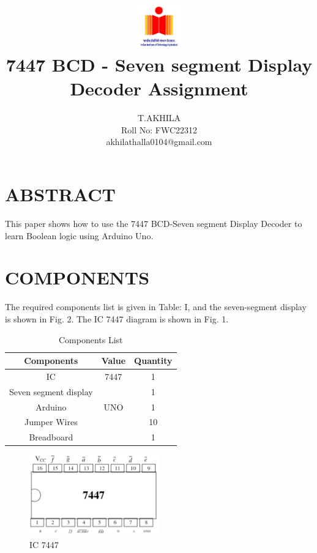 \documentclass[conference]{IEEEtran}
\title{
\vspace{1cm}
{\includegraphics[width=0.15\textwidth]{IMG-20241119-WA0001.jpg} \\ 
7447 BCD - Seven segment Display Decoder Assignment} }
\author{T.AKHILA\\ Roll No: FWC22312 \\akhilathalla0104@gmail.com}
\begin{document}
\maketitle

\section{ABSTRACT}
This paper shows how to use the 7447 BCD-Seven segment Display Decoder to learn Boolean logic using Arduino Uno.

\section{COMPONENTS}
The required components list is given in Table: I, and the seven-segment display is shown in Fig. 2. The IC 7447 diagram is shown in Fig. 1.
\vspace{0.3cm}

\begin{table}[htbp]
\centering
\begin{tabular}{| c | c | c |}
\hline
Components & Value & Quantity \\
\hline
IC & 7447 & 1 \\
\hline
Seven segment display & & 1 \\
\hline
Arduino & UNO & 1 \\
\hline
Jumper Wires & & 10 \\
\hline
Breadboard & & 1 \\
\hline
\end{tabular}
\vspace{0.3cm}
\caption{\label{tab:widgets} Components List}
\end{table}

\begin{figure}[htbp]                           
\centering                            
\includegraphics[width=0.5\textwidth]{IMG-20241119-WA0006.jpg}                      
\caption{\label{fig-1:Gates} IC 7447}           
\end{figure}
\end{document}
